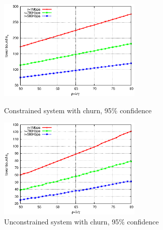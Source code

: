 \documentclass[paper]{ieice}
\begin{document}
\begin{figure}[tb]
\begin{minipage}[b]{0.4\linewidth}
\centering
\includegraphics[width=2.7in]{graphs/constrained.eps}
\caption{Constrained system with churn, 95\% confidence}
\label{fig:cons}
\end{minipage}
\hspace{0.5cm}
\begin{minipage}[b]{0.5\linewidth}
\centering
\includegraphics[width=2.7in]{graphs/unconstrained.eps}
\caption{Unconstrained system with churn, 95\% confidence}
\label{fig:uncons}
\end{minipage}
\end{figure}
 
\end{document}
